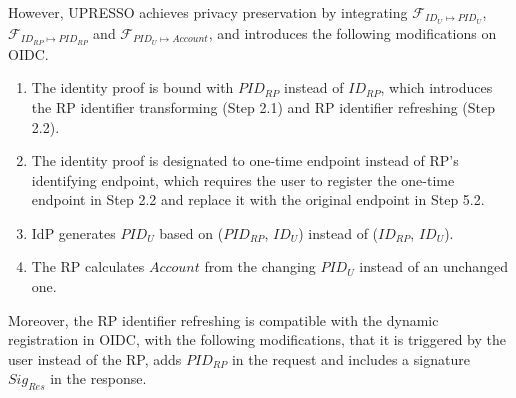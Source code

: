 
However, UPRESSO achieves privacy preservation by integrating  $\mathcal{F}_{ID_{U} \mapsto PID_{U}}$, $\mathcal{F}_{ID_{RP} \mapsto PID_{RP}}$ and $\mathcal{F}_{PID_{U} \mapsto Account}$, and  introduces the following modifications on OIDC.

\begin{enumerate}
  \item The identity proof is bound with $PID_{RP}$ instead of $ID_{RP}$, which introduces the RP identifier transforming (Step 2.1)  and RP identifier refreshing (Step 2.2).
  \item The identity proof is designated to one-time endpoint instead of RP's identifying endpoint, which requires the user to register the one-time endpoint in Step 2.2 and replace it with the original endpoint in Step 5.2.
  \item IdP generates $PID_U$ based on ($PID_{RP}$, $ID_U$) instead of ($ID_{RP}$, $ID_U$).
  \item The RP calculates $Account$ from the changing $PID_U$ instead of an unchanged one.
\end{enumerate}

Moreover, the RP identifier refreshing is compatible with the dynamic registration in OIDC, with the following modifications, that it is triggered by the user instead of the RP, adds $PID_{RP}$ in the request and includes a signature $Sig_{Res}$ in the response.

